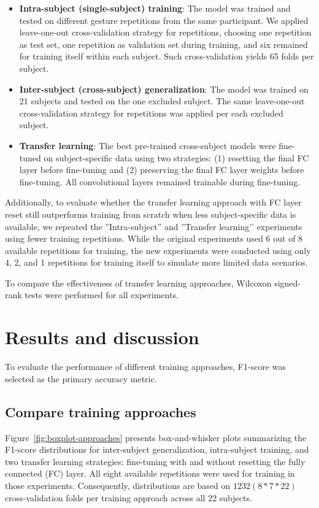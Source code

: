 \begin{itemize}
    \item \textbf{Intra-subject (single-subject) training}: The model was trained and tested on different gesture repetitions from the same participant. We applied leave-one-out cross-validation strategy for repetitions, choosing one repetition as test set, one repetition as validation set during training, and six remained for training itself within each subject. Such cross-validation yields 65 folds per subject.
    \item \textbf{Inter-subject (cross-subject) generalization}: The model was trained on 21 subjects and tested on the one excluded subject. The same leave-one-out cross-validation strategy for repetitions was applied per each excluded subject.
    \item \textbf{Transfer learning}: The best pre-trained cross-subject models were fine-tuned on subject-specific data using two strategies: (1) resetting the final FC layer before fine-tuning and (2) preserving the final FC layer weights before fine-tuning. All convolutional layers remained trainable during fine-tuning.
\end{itemize}

Additionally, to evaluate whether the transfer learning approach with FC layer reset still outperforms training from scratch when less subject-specific data is available, we repeated the ''Intra-subject'' and ''Transfer learning’’ experiments using fewer training repetitions. While the original experiments used 6 out of 8 available repetitions for training, the new experiments were conducted using only 4, 2, and 1 repetitions for training itself to simulate more limited data scenarios.

To compare the effectiveness of transfer learning approaches, Wilcoxon signed-rank tests were performed for all experiments.

\section{Results and discussion}

To evaluate the performance of different training approaches, F1-score was selected as the primary accuracy metric.

\subsection*{Compare training approaches}

Figure~\ref{fig:boxplot-approaches} presents box-and-whisker plots summarizing the F1-score distributions for inter-subject generalization, intra-subject training, and two transfer learning strategies: fine-tuning with and without resetting the fully connected (FC) layer. All eight available repetitions were used for training in those experiments. Consequently, distributions are based on $1232 (8*7*22)$ cross-validation folds per training approach across all 22 subjects.

